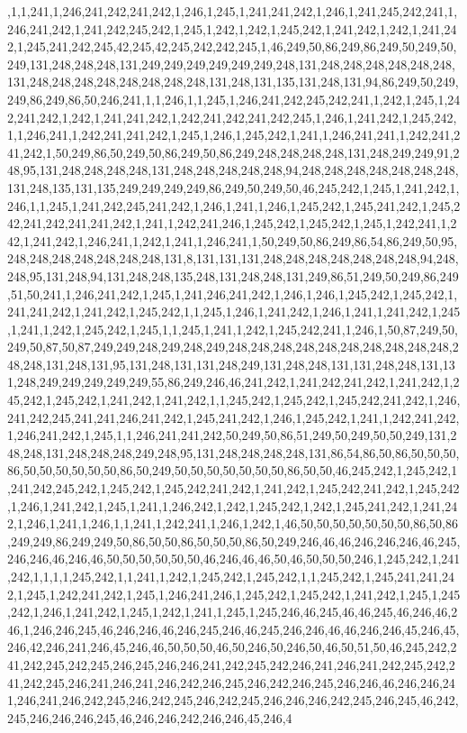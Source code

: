 ,1,1,241,1,246,241,242,241,242,1,246,1,245,1,241,241,242,1,246,1,241,245,242,241,1,246,241,242,1,241,242,245,242,1,245,1,242,1,242,1,245,242,1,241,242,1,242,1,241,242,1,245,241,242,245,42,245,42,245,242,242,245,1,46,249,50,86,249,86,249,50,249,50,249,131,248,248,248,131,249,249,249,249,249,249,248,131,248,248,248,248,248,248,131,248,248,248,248,248,248,248,248,131,248,131,135,131,248,131,94,86,249,50,249,249,86,249,86,50,246,241,1,1,246,1,1,245,1,246,241,242,245,242,241,1,242,1,245,1,242,241,242,1,242,1,241,241,242,1,242,241,242,241,242,245,1,246,1,241,242,1,245,242,1,1,246,241,1,242,241,241,242,1,245,1,246,1,245,242,1,241,1,246,241,241,1,242,241,241,242,1,50,249,86,50,249,50,86,249,50,86,249,248,248,248,248,131,248,249,249,91,248,95,131,248,248,248,248,131,248,248,248,248,248,94,248,248,248,248,248,248,248,131,248,135,131,135,249,249,249,249,86,249,50,249,50,46,245,242,1,245,1,241,242,1,246,1,1,245,1,241,242,245,241,242,1,246,1,241,1,246,1,245,242,1,245,241,242,1,245,242,241,242,241,241,242,1,241,1,242,241,246,1,245,242,1,245,242,1,245,1,242,241,1,242,1,241,242,1,246,241,1,242,1,241,1,246,241,1,50,249,50,86,249,86,54,86,249,50,95,248,248,248,248,248,248,248,131,8,131,131,131,248,248,248,248,248,248,248,94,248,248,95,131,248,94,131,248,248,135,248,131,248,248,131,249,86,51,249,50,249,86,249,51,50,241,1,246,241,242,1,245,1,241,246,241,242,1,246,1,246,1,245,242,1,245,242,1,241,241,242,1,241,242,1,245,242,1,1,245,1,246,1,241,242,1,246,1,241,1,241,242,1,245,1,241,1,242,1,245,242,1,245,1,1,245,1,241,1,242,1,245,242,241,1,246,1,50,87,249,50,249,50,87,50,87,249,249,248,249,248,249,248,248,248,248,248,248,248,248,248,248,248,248,131,248,131,95,131,248,131,131,248,249,131,248,248,131,131,248,248,131,131,248,249,249,249,249,249,55,86,249,246,46,241,242,1,241,242,241,242,1,241,242,1,245,242,1,245,242,1,241,242,1,241,242,1,1,245,242,1,245,242,1,245,242,241,242,1,246,241,242,245,241,241,246,241,242,1,245,241,242,1,246,1,245,242,1,241,1,242,241,242,1,246,241,242,1,245,1,1,246,241,241,242,50,249,50,86,51,249,50,249,50,50,249,131,248,248,131,248,248,248,249,248,95,131,248,248,248,248,131,86,54,86,50,86,50,50,50,86,50,50,50,50,50,50,86,50,249,50,50,50,50,50,50,50,86,50,50,46,245,242,1,245,242,1,241,242,245,242,1,245,242,1,245,242,241,242,1,241,242,1,245,242,241,242,1,245,242,1,246,1,241,242,1,245,1,241,1,246,242,1,242,1,245,242,1,242,1,245,241,242,1,241,242,1,246,1,241,1,246,1,1,241,1,242,241,1,246,1,242,1,46,50,50,50,50,50,50,50,86,50,86,249,249,86,249,249,50,86,50,50,86,50,50,50,86,50,249,246,46,46,246,246,246,46,245,246,246,46,246,46,50,50,50,50,50,50,46,246,46,46,50,46,50,50,50,246,1,245,242,1,241,242,1,1,1,1,245,242,1,1,241,1,242,1,245,242,1,245,242,1,1,245,242,1,245,241,241,242,1,245,1,242,241,242,1,245,1,246,241,246,1,245,242,1,245,242,1,241,242,1,245,1,245,242,1,246,1,241,242,1,245,1,242,1,241,1,245,1,245,246,46,245,46,46,245,46,246,46,246,1,246,246,245,46,246,246,46,246,245,246,46,245,246,246,46,46,246,246,45,246,45,246,42,246,241,246,45,246,46,50,50,50,46,50,246,50,246,50,46,50,51,50,46,245,242,241,242,245,242,245,246,245,246,246,241,242,245,242,246,241,246,241,242,245,242,241,242,245,246,241,246,241,246,242,246,245,246,242,246,245,246,246,46,246,246,241,246,241,246,242,245,246,242,245,246,242,245,246,246,246,242,245,246,245,46,242,245,246,246,246,245,46,246,246,242,246,246,45,246,4